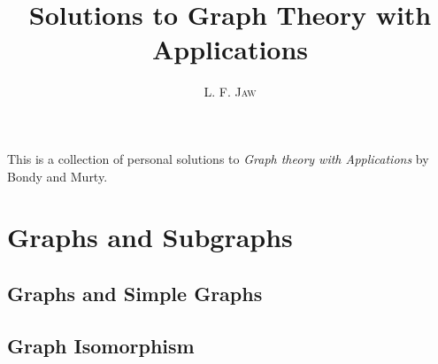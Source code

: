 \documentclass[a4paper]{book}
\title{Solutions to Graph Theory with Applications}
\author{L. F. \textsc{Jaw}}
\begin{document}
\frontmatter
\maketitle

This is a collection of personal solutions to \textit{Graph theory
  with Applications} by Bondy and Murty.

\mainmatter

\chapter{Graphs and Subgraphs}
\label{chap:1}

\section{Graphs and Simple Graphs}
\label{sec:1.1}

\section{Graph Isomorphism}
\label{sec:1.2}
\end{document}
